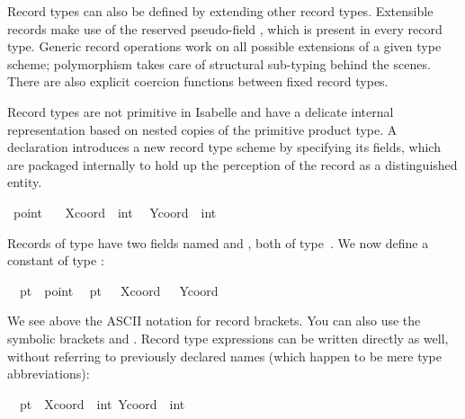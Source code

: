 \begin{isabellebody}
\begin{isamarkuptext}
  Record types can also be defined by extending other record types.
  Extensible records make use of the reserved pseudo-field ,
  which is present in every record type.  Generic record operations
  work on all possible extensions of a given type scheme; polymorphism
  takes care of structural sub-typing behind the scenes.  There are
  also explicit coercion functions between fixed record types.%
\end{isamarkuptext}%
\isamarkuptrue%
%
\isamarkuptrue%
%
\begin{isamarkuptext}%
Record types are not primitive in Isabelle and have a delicate
  internal representation based on nested copies of the primitive
  product type.  A  declaration introduces a new record
  type scheme by specifying its fields, which are packaged internally
  to hold up the perception of the record as a distinguished entity.%
\end{isamarkuptext}%
\isamarkuptrue%
\ point\ {\isacharequal}\isanewline
\ \ Xcoord\ {\isacharcolon}{\isacharcolon}\ int\isanewline
\ \ Ycoord\ {\isacharcolon}{\isacharcolon}\ int\isamarkupfalse%
%
\begin{isamarkuptext}%
Records of type  have two fields named 
  and , both of type~.  We now define a
  constant of type :%
\end{isamarkuptext}%
\isamarkuptrue%
\isanewline
\ \ pt{}\ {\isacharcolon}{\isacharcolon}\ point\isanewline
\ \ {\isachardoublequote}pt{}\ {\isasymequiv}\ {\isacharparenleft}{\isacharbar}\ Xcoord\ {\isacharequal}\ {}{}{}{\isacharcomma}\ Ycoord\ {\isacharequal}\ {}{}\ {\isacharbar}{\isacharparenright}{\isachardoublequote}\isamarkupfalse%
%
\begin{isamarkuptext}%
We see above the ASCII notation for record brackets.  You can also
  use the symbolic brackets \isa{{\isasymlparr}} and \isa{{\isasymrparr}}.  Record type
  expressions can be written directly as well, without referring to
  previously declared names (which happen to be mere type
  abbreviations):%
\end{isamarkuptext}%
\isamarkuptrue%
\isanewline
\ \ pt{}\ {\isacharcolon}{\isacharcolon}\ {\isachardoublequote}{\isasymlparr}Xcoord\ {\isacharcolon}{\isacharcolon}\ int{\isacharcomma}\ Ycoord\ {\isacharcolon}{\isacharcolon}\ int{\isasymrparr}{\isachardoublequote}\isanewline

\end{isabellebody}
